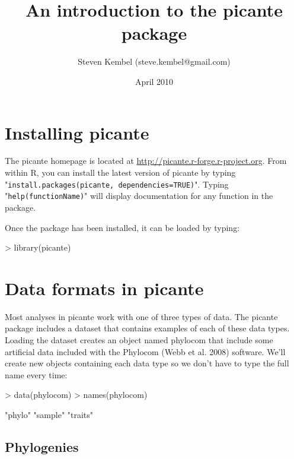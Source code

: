 \documentclass[12pt]{article}
\title{An introduction to the picante package}
\author{Steven Kembel (steve.kembel@gmail.com)}
\date{April 2010}
\begin{document}
\maketitle

\tableofcontents

\section{Installing picante}

The picante homepage is located at \url{http://picante.r-forge.r-project.org}. From within R, you can install the latest version of picante by typing "\texttt{install.packages(picante, dependencies=TRUE)}". Typing "\texttt{help(functionName)}" will display documentation for any function in the package.

Once the package has been installed, it can be loaded by typing:

\begin{Schunk}
\begin{Sinput}
> library(picante)
\end{Sinput}
\end{Schunk}

\section{Data formats in picante}

Most analyses in picante work with one of three types of data. The picante package includes a dataset that contains examples of each of these data types. Loading the dataset creates an object named phylocom that include some artificial data included with the Phylocom (Webb et al. 2008) software. We'll create new objects containing each data type so we don't have to type the full name every time:

\begin{Schunk}
\begin{Sinput}
> data(phylocom)
> names(phylocom)
\end{Sinput}
\begin{Soutput}
[1] "phylo"  "sample" "traits"
\end{Soutput}
\end{Schunk}

\subsection{Phylogenies}
\end{document}
